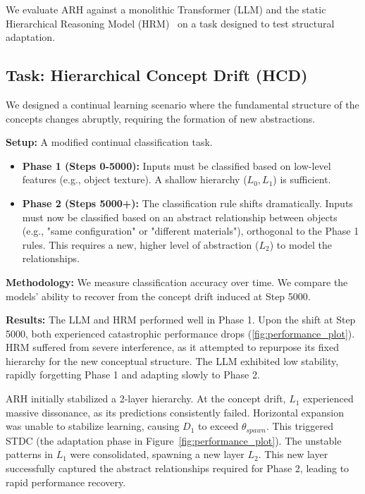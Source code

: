 \documentclass{article}
\begin{document}
We evaluate ARH against a monolithic Transformer (LLM) and the static Hierarchical Reasoning Model (HRM)~\cite{HRM2025} on a task designed to test structural adaptation.

\subsection{Task: Hierarchical Concept Drift (HCD)}
We designed a continual learning scenario where the fundamental structure of the concepts changes abruptly, requiring the formation of new abstractions.

\textbf{Setup:} A modified continual classification task.
\begin{itemize}
    \item \textbf{Phase 1 (Steps 0-5000):} Inputs must be classified based on low-level features (e.g., object texture). A shallow hierarchy ($L_0, L_1$) is sufficient.
    \item \textbf{Phase 2 (Steps 5000+):} The classification rule shifts dramatically. Inputs must now be classified based on an abstract relationship between objects (e.g., "same configuration" or "different materials"), orthogonal to the Phase 1 rules. This requires a new, higher level of abstraction ($L_2$) to model the relationships.
\end{itemize}

\textbf{Methodology:} We measure classification accuracy over time. We compare the models' ability to recover from the concept drift induced at Step 5000.

\textbf{Results:}
The LLM and HRM performed well in Phase 1. Upon the shift at Step 5000, both experienced catastrophic performance drops (\cref{fig:performance_plot}). HRM suffered from severe interference, as it attempted to repurpose its fixed hierarchy for the new conceptual structure. The LLM exhibited low stability, rapidly forgetting Phase 1 and adapting slowly to Phase 2.

ARH initially stabilized a 2-layer hierarchy. At the concept drift, $L_1$ experienced massive dissonance, as its predictions consistently failed. Horizontal expansion was unable to stabilize learning, causing $D_1$ to exceed $\theta_{spawn}$. This triggered STDC (the adaptation phase in Figure~\ref{fig:performance_plot}). The unstable patterns in $L_1$ were consolidated, spawning a new layer $L_2$. This new layer successfully captured the abstract relationships required for Phase 2, leading to rapid performance recovery.
\end{document}
